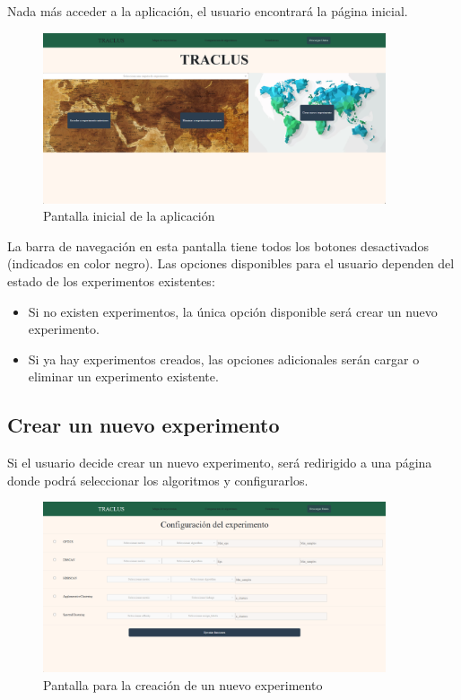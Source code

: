 Nada más acceder a la aplicación, el usuario encontrará la página inicial. 

\begin{figure}[H]
    \centering
    \includegraphics[width=0.9\textwidth]{img/main_page.png}
    \caption{Pantalla inicial de la aplicación}
\end{figure}

La barra de navegación en esta pantalla tiene todos los botones desactivados (indicados en color negro). Las opciones disponibles para el usuario dependen del estado de los experimentos existentes:

\begin{itemize}
    \item Si no existen experimentos, la única opción disponible será crear un nuevo experimento.
    \item Si ya hay experimentos creados, las opciones adicionales serán cargar o eliminar un experimento existente.
\end{itemize}

\subsection{Crear un nuevo experimento}

Si el usuario decide crear un nuevo experimento, será redirigido a una página donde podrá seleccionar los algoritmos y configurarlos. 

\begin{figure}[H]
    \centering
    \includegraphics[width=0.9\textwidth]{img/experiment_page.png}
    \caption{Pantalla para la creación de un nuevo experimento}
\end{figure}

